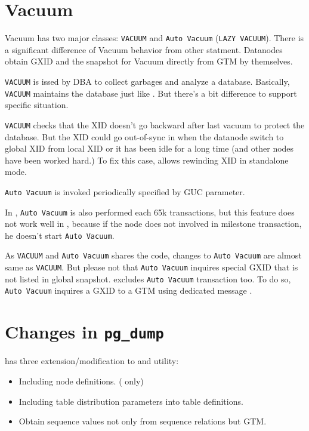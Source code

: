 %
%
%


\section{\label{sec:vacuum}Vacuum}

  Vacuum has two major classes: \texttt{VACUUM} and \texttt{Auto Vacuum} (\texttt{LAZY VACUUM}).
  There is a significant difference of Vacuum behavior from other statment.
  Datanodes obtain GXID and the snapshot for Vacuum directly from GTM by themselves.

  \texttt{VACUUM} is issed by DBA to collect garbages and analyze a database.
  Basically, \texttt{VACUUM} maintains the database just like \PG.
  But there's a bit difference to support \XC{} specific situation.
  
  \texttt{VACUUM} checks that the XID doesn't go backward after last vacuum to protect the database.
  But the XID could go out-of-sync in \XC{} when the datanode switch to global XID
  from local XID or it has been idle for a long time
  (and other nodes have been worked hard.)
  To fix this case, \XC{} allows rewinding XID in standalone mode.
  
  \texttt{Auto Vacuum} is invoked periodically specified by  GUC parameter.

  In \PG{}, \texttt{Auto Vacuum} is also performed each 65k transactions,
  but this feature does not work well in \XC{},
  because if the node does not involved in milestone transaction, he doesn't start \texttt{Auto Vacuum}.

  As \texttt{VACUUM} and \texttt{Auto Vacuum} shares the code, changes to \texttt{Auto Vacuum}
  are almost same as \texttt{VACUUM}.
  But please not that \texttt{Auto Vacuum} inquires special GXID that is not listed in global snapshot.
  \PG{} excludes \texttt{Auto Vacuum} transaction too.
  To do so, \texttt{Auto Vacuum} inquires a GXID to a GTM using dedicated message .


\section{\label{sec:pgdump}Changes in \texttt{pg\_dump}}

  \XC{} has three extension/modification to  and  utility:
  
  \begin{itemize}
	  \item Including node definitions. ( only)
	  \item Including table distribution parameters into table definitions.
	  \item Obtain sequence values not only from sequence relations
            but GTM.
  \end{itemize}
  
